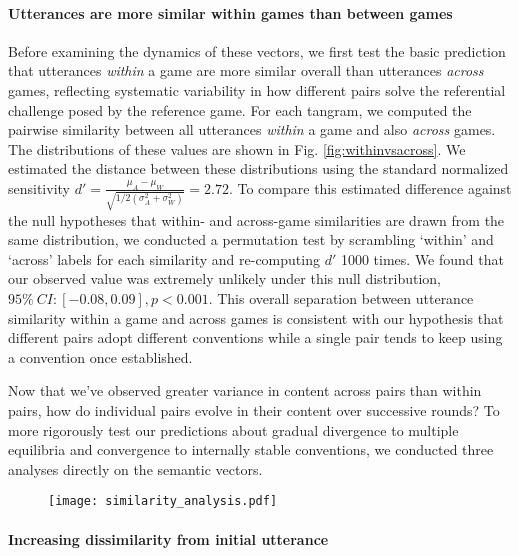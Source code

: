 \paragraph{Utterances are more similar within games than between games}  
Before examining the dynamics of these vectors, we first test the basic prediction that utterances \emph{within} a game are more similar overall than utterances \emph{across} games, reflecting systematic variability in how different pairs solve the referential challenge posed by the reference game.
For each tangram, we computed the pairwise similarity between all utterances \emph{within} a game and also \emph{across} games. 
The distributions of these values are shown in Fig. \ref{fig:withinvsacross}.
We estimated the distance between these distributions using the standard normalized sensitivity $d' = \frac{\mu_A - \mu_W}{\sqrt{1/2(\sigma^2_A+\sigma^2_W)}} = 2.72$.
To compare this estimated difference against the null hypotheses that within- and across-game similarities are drawn from the same distribution, we conducted a permutation test by scrambling `within' and `across' labels for each similarity and re-computing $d'$ 1000 times. 
We found that our observed value was extremely unlikely under this null distribution, $95\%~CI: [-0.08, 0.09], p < 0.001$. 
This overall separation between utterance similarity within a game and across games is consistent with our hypothesis that different pairs adopt different conventions while a single pair tends to keep using a convention once established.

Now that we've observed greater variance in content across pairs than within pairs, how do individual pairs evolve in their content over successive rounds?
To more rigorously test our predictions about gradual divergence to multiple equilibria and convergence to internally stable conventions, we conducted three analyses directly on the semantic vectors.

\begin{figure}
\texttt{[image: similarity\_analysis.pdf]}
\caption{}
\label{fig:similarity}
\end{figure}

\paragraph{Increasing dissimilarity from initial utterance}

